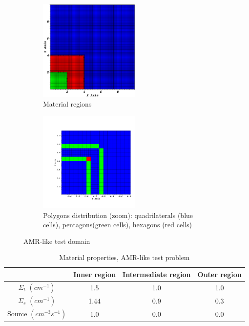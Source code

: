 \begin{figure}[!htbp]
  \centering
  \begin{subfigure}{0.45\textwidth}
    \centering
    \includegraphics[width=5cm]{zone_amr}
    \caption{Material regions}
    \label{mat_amr}
  \end{subfigure}
  \begin{subfigure}{0.45\textwidth}
    \centering
    \includegraphics[width=5cm]{amr_grid0001}
    \caption{Polygons distribution (zoom): quadrilaterals (blue cells),  pentagons(green cells),  hexagons (red cells)}
    \label{fig_pol_dist}
  \end{subfigure}
  \caption{AMR-like test domain}
\end{figure}
%
\begin{table}
  \begin{center}
    \caption{Material properties, AMR-like test problem}
    \begin{tabular}{|c|c|c|c|}
      \hline
      & Inner region & Intermediate region & Outer region  \\ \hline
    $\Sigma_t$ $(cm^{-1})$ & 1.5  & 1.0 & 1.0 \\
    $\Sigma_s$ $(cm^{-1})$ & 1.44 & 0.9 & 0.3 \\
  Source $(cm^{-3}s^{-1})$ & 1.0  & 0.0 & 0.0 \\
      \hline
    \end{tabular}
    \label{prop_amr}
  \end{center}
\end{table}

